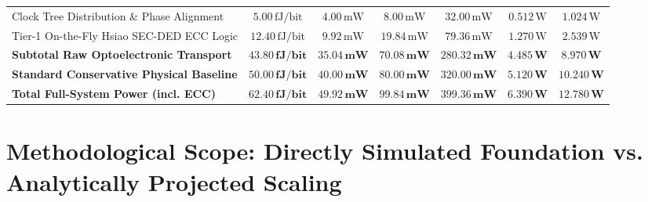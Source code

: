 \documentclass[journal]{IEEEtran}
\begin{document}
\begin{table}[!t]
{\begin{tabular}{lcccccc}
Clock Tree Distribution \& Phase Alignment & $5.00\,\text{fJ/bit}$ & $4.00\,\text{mW}$ & $8.00\,\text{mW}$ & $32.00\,\text{mW}$ & $0.512\,\text{W}$ & $1.024\,\text{W}$ \\
Tier-1 On-the-Fly Hsiao SEC-DED ECC Logic & $12.40\,\text{fJ/bit}$ & $9.92\,\text{mW}$ & $19.84\,\text{mW}$ & $79.36\,\text{mW}$ & $1.270\,\text{W}$ & $2.539\,\text{W}$ \\
\midrule
\textbf{Subtotal Raw Optoelectronic Transport} & $\mathbf{43.80\,\text{fJ/bit}}$ & $\mathbf{35.04\,\text{mW}}$ & $\mathbf{70.08\,\text{mW}}$ & $\mathbf{280.32\,\text{mW}}$ & $\mathbf{4.485\,\text{W}}$ & $\mathbf{8.970\,\text{W}}$ \\
\textbf{Standard Conservative Physical Baseline} & $\mathbf{50.00\,\text{fJ/bit}}$ & $\mathbf{40.00\,\text{mW}}$ & $\mathbf{80.00\,\text{mW}}$ & $\mathbf{320.00\,\text{mW}}$ & $\mathbf{5.120\,\text{W}}$ & $\mathbf{10.240\,\text{W}}$ \\
\textbf{Total Full-System Power (incl. ECC)} & $\mathbf{62.40\,\text{fJ/bit}}$ & $\mathbf{49.92\,\text{mW}}$ & $\mathbf{99.84\,\text{mW}}$ & $\mathbf{399.36\,\text{mW}}$ & $\mathbf{6.390\,\text{W}}$ & $\mathbf{12.780\,\text{W}}$ \\
\bottomrule
\end{tabular}
}
\end{table}

\section{Methodological Scope: Directly Simulated Foundation vs. Analytically Projected Scaling}
\label{sec:scope}
\end{document}
